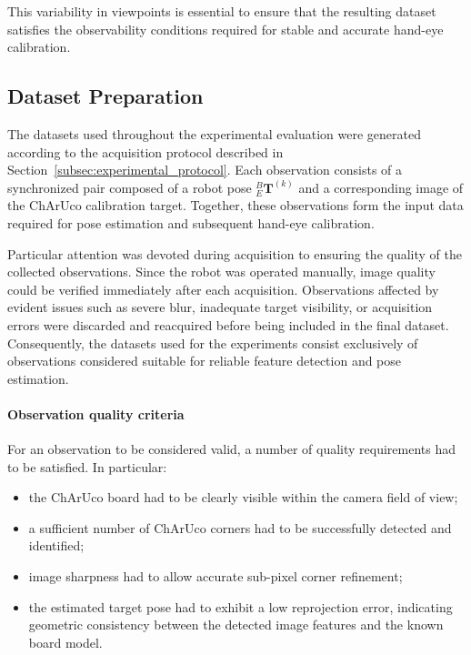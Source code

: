 \noindent This variability in viewpoints is essential to ensure that the resulting dataset satisfies the observability conditions required for stable and accurate hand-eye calibration.








\subsection{Dataset Preparation}
\label{subsec:dataset_preparation}

The datasets used throughout the experimental evaluation were generated according to the acquisition protocol described in Section~\ref{subsec:experimental_protocol}. Each observation consists of a synchronized pair composed of a robot pose ${}^B_E\mathbf{T}^{(k)}$ and a corresponding image of the ChArUco calibration target. Together, these observations form the input data required for pose estimation and subsequent hand-eye calibration.

Particular attention was devoted during acquisition to ensuring the quality of the collected observations. Since the robot was operated manually, image quality could be verified immediately after each acquisition. Observations affected by evident issues such as severe blur, inadequate target visibility, or acquisition errors were discarded and reacquired before being included in the final dataset. Consequently, the datasets used for the experiments consist exclusively of observations considered suitable for reliable feature detection and pose estimation.

\paragraph{Observation quality criteria}

For an observation to be considered valid, a number of quality requirements had to be satisfied. In particular:

\begin{itemize}
	\item the ChArUco board had to be clearly visible within the camera field of view;
	

	\item a sufficient number of ChArUco corners had to be successfully detected and identified;
	
	\item image sharpness had to allow accurate sub-pixel corner refinement;
	
	\item the estimated target pose had to exhibit a low reprojection error, indicating geometric consistency between the detected image features and the known board model.
	
	
\end{itemize}

